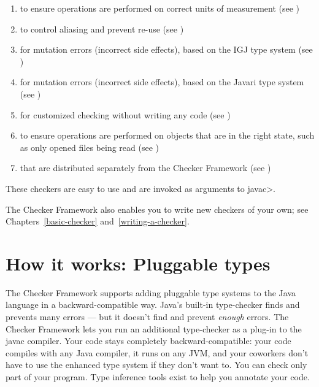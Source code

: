 \begin{enumerate}
\item
   to ensure operations are
  performed on correct units of measurement
  (see )
\item
   to control aliasing and prevent
  re-use (see )
\item
   for mutation errors (incorrect
  side effects), based on the IGJ type system (see
  )
\item
   for mutation errors
  (incorrect side effects), based on the Javari type system (see
  )
\item
   for customized checking without
  writing any code (see )
\item
   to ensure operations are
  performed on objects that are in the right state, such as only opened
  files being read (see )
\item
   that are distributed
  separately from the Checker Framework
  (see )

\end{enumerate}

\noindent
These checkers are easy to use and are invoked as arguments to \<javac>.


The Checker Framework also enables you to write new checkers of your
own; see Chapters~\ref{basic-checker} and~\ref{writing-a-checker}.


\section{How it works:  Pluggable types\label{pluggable-types}}

The Checker Framework supports adding
pluggable type systems to the Java language in a backward-compatible way.
Java's built-in type-checker finds and prevents many errors --- but it
doesn't find and prevent \emph{enough} errors.  The Checker Framework lets you
run an additional type-checker as a plug-in to the javac compiler.  Your
code stays completely backward-compatible:  your code compiles with any
Java compiler, it runs on any JVM, and your coworkers don't have to use the
enhanced type system if they don't want to.  You can check only part of
your program.  Type inference tools exist to help you annotate your
code.


